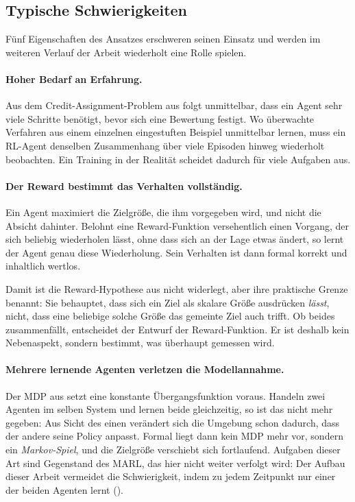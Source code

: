 \subsection{Typische Schwierigkeiten}
\label{sec:rl-schwierigkeiten}

Fünf Eigenschaften des Ansatzes erschweren seinen Einsatz und werden im weiteren
Verlauf der Arbeit wiederholt eine Rolle spielen.

\paragraph{Hoher Bedarf an Erfahrung.}
Aus dem Credit-Assignment-Problem aus  folgt unmittelbar, dass
ein Agent sehr viele Schritte benötigt, bevor sich eine Bewertung festigt. Wo
überwachte Verfahren aus einem einzelnen eingestuften Beispiel unmittelbar
lernen, muss ein \ac{RL}-Agent denselben Zusammenhang über viele Episoden hinweg
wiederholt beobachten. Ein Training in der Realität scheidet dadurch für viele
Aufgaben aus.

\paragraph{Der Reward bestimmt das Verhalten vollständig.}
Ein Agent maximiert die Zielgröße, die ihm vorgegeben wird, und nicht die
Absicht dahinter. Belohnt eine Reward-Funktion versehentlich einen Vorgang, der
sich beliebig wiederholen lässt, ohne dass sich an der Lage etwas ändert, so
lernt der Agent genau diese Wiederholung. Sein Verhalten ist dann formal korrekt
und inhaltlich wertlos.

Damit ist die Reward-Hypothese aus  nicht widerlegt,
aber ihre praktische Grenze benannt: Sie behauptet, dass sich ein Ziel als
skalare Größe ausdrücken \emph{lässt}, nicht, dass eine beliebige solche Größe
das gemeinte Ziel auch trifft. Ob beides zusammenfällt, entscheidet der Entwurf
der Reward-Funktion. Er ist deshalb kein Nebenaspekt, sondern bestimmt, was
überhaupt gemessen wird.

\paragraph{Mehrere lernende Agenten verletzen die Modellannahme.}
Der \ac{MDP} aus  setzt eine konstante Übergangsfunktion voraus.
Handeln zwei Agenten im selben System und lernen beide gleichzeitig, so ist das
nicht mehr gegeben: Aus Sicht des einen verändert sich die Umgebung schon
dadurch, dass der andere seine Policy anpasst. Formal liegt dann kein \ac{MDP}
mehr vor, sondern ein \emph{Markov-Spiel}, und die Zielgröße verschiebt sich
fortlaufend. Aufgaben dieser Art sind Gegenstand des \ac{MARL}, das hier nicht
weiter verfolgt wird: Der Aufbau dieser Arbeit vermeidet die Schwierigkeit,
indem zu jedem Zeitpunkt nur einer der beiden Agenten lernt
().

